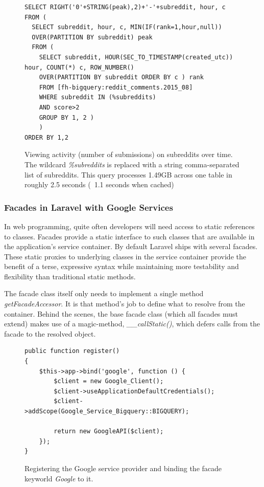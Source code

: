 \documentclass[msc,oneside]{ubcthesis}%
\begin{document}
\begin{figure}[H]
\begin{lstlisting}
SELECT RIGHT('0'+STRING(peak),2)+'-'+subreddit, hour, c 
FROM (
  SELECT subreddit, hour, c, MIN(IF(rank=1,hour,null)) 
  OVER(PARTITION BY subreddit) peak 
  FROM (
    SELECT subreddit, HOUR(SEC_TO_TIMESTAMP(created_utc)) hour, COUNT(*) c, ROW_NUMBER() 
    OVER(PARTITION BY subreddit ORDER BY c ) rank 
    FROM [fh-bigquery:reddit_comments.2015_08] 
    WHERE subreddit IN (%subreddits) 
    AND score>2 
    GROUP BY 1, 2 )
    )
ORDER BY 1,2
\end{lstlisting}
\caption[Query finding the best hours to post on Reddit]{
Viewing activity (number of submissions) on subreddits over time. The wildcard \textit{\%subreddits} is replaced with a string comma-separated list of subreddits. This query processes 1.49GB across one table in roughly 2.5 seconds (~1.1 seconds when cached)}
\end{figure}

\subsubsection{Facades in Laravel with Google Services}
In web programming, quite often developers will need access to static references to classes. Facades provide a static interface to such classes that are available in the application's service container. By default Laravel ships with several facades. These static proxies to underlying classes in the service container provide the benefit of a terse, expressive syntax while maintaining more testability and flexibility than traditional static methods.
\par
The facade class itself only needs to implement a single method \textit{getFacadeAccessor}. It is that method's job to define what to resolve from the container. Behind the scenes, the base facade class (which all facades must extend) makes use of a magic-method, \textit{\_\_callStatic()}, which defers calls from the facade to the resolved object. 

\begin{figure}[H]
\begin{lstlisting}
public function register()
{
	$this->app->bind('google', function () {
		$client = new Google_Client();
		$client->useApplicationDefaultCredentials();
		$client->addScope(Google_Service_Bigquery::BIGQUERY);
		
		return new GoogleAPI($client);
	});
}
\end{lstlisting}
\caption[Registering the Google service provider]{
Registering the Google service provider and binding the facade keyworld \textit{Google} to it.}
\end{figure}
\end{document}
